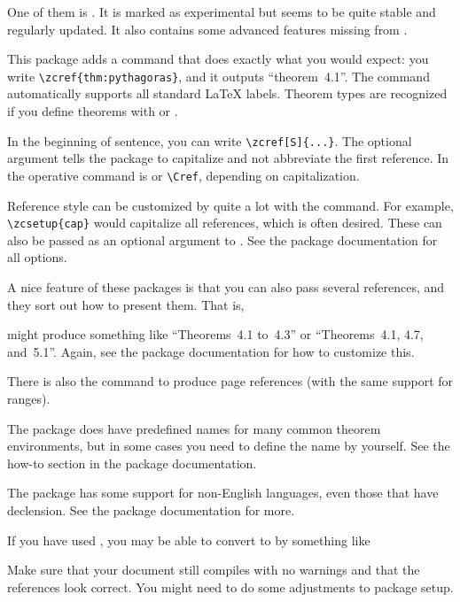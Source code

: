 One of them is .
It is marked as experimental but seems to be quite stable and regularly updated.
It also contains some advanced features missing from .

This package adds a  command
that does exactly what you would expect:
you write \verb|\zcref{thm:pythagoras}|,
and it outputs ``theorem~4.1''.
The command automatically supports all standard \LaTeX{} labels.
Theorem types are recognized if you define theorems with
 or .

In the beginning of sentence, you can write \verb|\zcref[S]{...}|.
The optional argument tells the package to capitalize and not abbreviate the first reference.
In  the operative command is  or \verb|\Cref|,
depending on capitalization.

Reference style can be customized by quite a lot
with the  command.
For example, \verb|\zcsetup{cap}| would capitalize all references, which is often desired.
These can also be passed as an optional argument to .
See the package documentation for all options.

A nice feature of these packages is that you can also pass several references,
and they sort out how to present them.
That is,
\begin{ExampleCode}
\end{ExampleCode}
might produce something like ``Theorems~4.1 to~4.3''
or ``Theorems~4.1, 4.7, and~5.1''.
Again, see the package documentation for how to customize this.

There is also the 
command to produce page references (with the same support for ranges).

The package does have predefined names for many common theorem environments,
but in some cases you need to define the name by yourself.
See the how-to section in the package documentation.

\begin{remark}
The  package has some support for non-English languages,
even those that have declension.
See the package documentation for more.
\end{remark}


\begin{practices}
If you have used , you may be able to convert to  by something like
\begin{ExampleCode}
\usepackage[capitalize]{cleveref}

\usepackage{zref-clever}
\newcommand{\cref}{\zcref}
\newcommand{\Cref}{\zcref[S]}
\end{ExampleCode}
Make sure that your document still compiles with no warnings and that the references look correct.
You might need to do some adjustments to package setup.
\end{practices}



